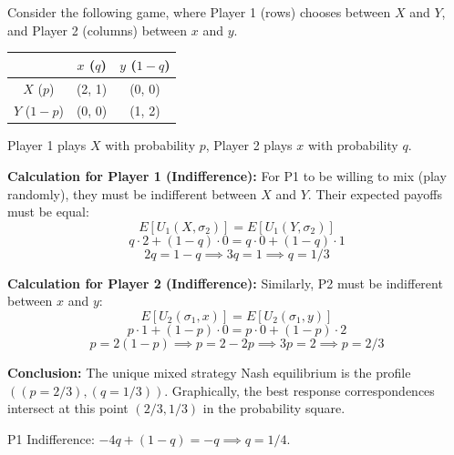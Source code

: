 \begin{exemple}
Consider the following game, where Player 1 (rows) chooses between $X$ and $Y$, and Player 2 (columns) between $x$ and $y$.
\begin{center}
\begin{tabular}{c|c|c}
 & $x$ ($q$) & $y$ ($1-q$) \\ \hline
$X$ ($p$) & (2, 1) & (0, 0) \\ \hline
$Y$ ($1-p$) & (0, 0) & (1, 2)
\end{tabular}
\end{center}
Player 1 plays $X$ with probability $p$, Player 2 plays $x$ with probability $q$.

\textbf{Calculation for Player 1 (Indifference):}
For P1 to be willing to mix (play randomly), they must be indifferent between $X$ and $Y$. Their expected payoffs must be equal:
\[ E[U_1(X, \sigma_2)] = E[U_1(Y, \sigma_2)] \]
\[ q \cdot 2 + (1-q) \cdot 0 = q \cdot 0 + (1-q) \cdot 1 \]
\[ 2q = 1 - q \implies 3q = 1 \implies q = 1/3 \]

\textbf{Calculation for Player 2 (Indifference):}
Similarly, P2 must be indifferent between $x$ and $y$:
\[ E[U_2(\sigma_1, x)] = E[U_2(\sigma_1, y)] \]
\[ p \cdot 1 + (1-p) \cdot 0 = p \cdot 0 + (1-p) \cdot 2 \]
\[ p = 2(1 - p) \implies p = 2 - 2p \implies 3p = 2 \implies p = 2/3 \]

\textbf{Conclusion:} The unique mixed strategy Nash equilibrium is the profile $((p=2/3), (q=1/3))$.
Graphically, the best response correspondences intersect at this point $(2/3, 1/3)$ in the probability square.
\end{exemple}

\begin{exemple}
P1 Indifference: $-4q + (1-q) = -q \implies q = 1/4$.
\end{exemple}
